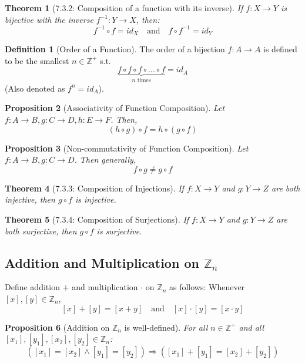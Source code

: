 \documentclass{article}
\theoremstyle{plain}
\newtheorem{theorem}{Theorem}[section]
\newtheorem{proposition}[theorem]{Proposition}
\theoremstyle{definition}
\newtheorem*{definition}{Definition}
\theoremstyle{remark}
\begin{document}
\begin{theorem}[7.3.2: Composition of a function with its inverse]
    If $f: X \rightarrow Y$ is bijective with the inverse $f^{-1}: Y \rightarrow X$, then:
    \[ f^{-1} \circ f = id_X \quad \text{and} \quad f \circ f^{-1} = id_Y \]
\end{theorem}

\begin{definition}[Order of a Function]
    The order of a bijection $f: A \rightarrow A$ is defined to be the smallest $n \in \mathbb{Z}^+$ s.t. 
    \[ \underbrace{f \circ f \circ f \circ \dots \circ f}_{n \text{ times}} = id_A \]
    (Also denoted as $f^n = id_A$).
\end{definition}

\begin{proposition}[Associativity of Function Composition]
    Let $f: A \rightarrow B, g: C \rightarrow D, h: E \rightarrow F$. Then,
    \[ (h \circ g) \circ f = h \circ (g \circ f) \]
\end{proposition}

\begin{proposition}[Non-commutativity of Function Composition]
    Let $f: A \rightarrow B, g: C \rightarrow D$. Then generally,
    \[ f \circ g \neq g \circ f \]
\end{proposition}

\begin{theorem}[7.3.3: Composition of Injections]
    If $f: X \rightarrow Y$ and $g: Y \rightarrow Z$ are both injective, then $g \circ f$ is injective.
\end{theorem}

\begin{theorem}[7.3.4: Composition of Surjections]
    If $f: X \rightarrow Y$ and $g: Y \rightarrow Z$ are both surjective, then $g \circ f$ is surjective.
\end{theorem}

\subsection{Addition and Multiplication on $\mathbb{Z}_n$}
Define addition $+$ and multiplication $\cdot$ on $\mathbb{Z}_n$ as follows:
Whenever $[x], [y] \in \mathbb{Z}_n$,
\[ [x] + [y] = [x + y] \quad \text{and} \quad [x] \cdot [y] = [x \cdot y] \]

\begin{proposition}[Addition on $\mathbb{Z}_n$ is well-defined]
    For all $n \in \mathbb{Z}^+$ and all $[x_1], [y_1], [x_2], [y_2] \in \mathbb{Z}_n$:
    \[ ([x_1] = [x_2] \wedge [y_1] = [y_2]) \Rightarrow ([x_1] + [y_1] = [x_2] + [y_2]) \]
\end{proposition}
\end{document}
